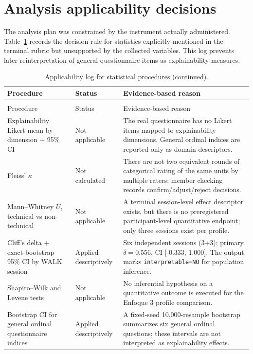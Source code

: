 \documentclass[pdflatex,sn-basic]{sn-jnl}
\begin{document}
\section{Analysis applicability decisions}\label{app:analysis-decisions}
The analysis plan was constrained by the instrument actually administered. Table~\ref{tab:applicability} records the decision rule for statistics explicitly mentioned in the terminal rubric but unsupported by the collected variables. This log prevents later reinterpretation of general questionnaire items as explainability measures.

{\footnotesize
\setlength{\tabcolsep}{2pt}
\begin{longtable}{@{}p{3.4cm}p{2.2cm}p{6.7cm}@{}}
\caption{Applicability log for statistical procedures.}\label{tab:applicability}\\
\toprule Procedure & Status & Evidence-based reason \\
\midrule
\endfirsthead
\caption[]{Applicability log for statistical procedures (continued).}\\
\toprule Procedure & Status & Evidence-based reason \\
\midrule
\endhead
\bottomrule
\endfoot
Explainability Likert mean by dimension + 95\% CI & Not applicable & The real questionnaire has no Likert items mapped to explainability dimensions. General ordinal indices are reported only as domain descriptors.\\
Fleiss' $\kappa$ & Not calculated & There are not two equivalent rounds of categorical rating of the same units by multiple raters; member checking records confirm/adjust/reject decisions.\\
Mann--Whitney $U$, technical vs non-technical & Not applicable & A terminal session-level effect descriptor exists, but there is no preregistered participant-level quantitative endpoint; only three sessions exist per profile.\\
Cliff's delta + exact-bootstrap 95\% CI by WALK session & Applied descriptively & Six independent sessions (3+3); primary $\delta=0.556$, CI [-0.333, 1.000]. The output marks \texttt{interpretable=NO} for population inference.\\
Shapiro--Wilk and Levene tests & Not applicable & No inferential hypothesis on a quantitative outcome is executed for the Enfoque 3 profile comparison.\\
Bootstrap CI for general ordinal questionnaire indices & Applied descriptively & A fixed-seed 10,000-resample bootstrap summarizes six general ordinal questions; these intervals are not interpreted as explainability effects.\\
\end{longtable}
}
\end{document}
